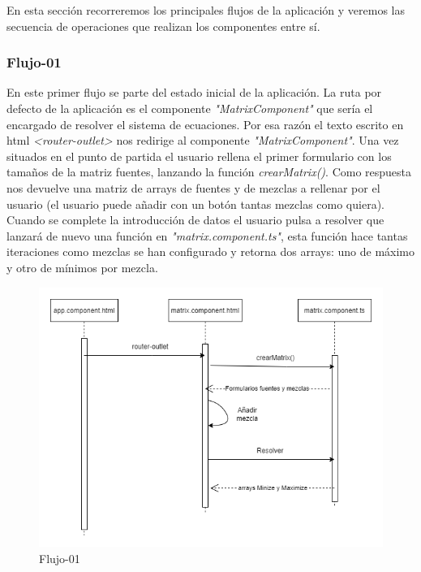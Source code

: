 En esta sección recorreremos los principales flujos de la aplicación y veremos las secuencia de operaciones que realizan los componentes entre sí.

\subsubsection{Flujo-01}

En este primer flujo se parte del estado inicial de la aplicación. La ruta por defecto de la aplicación es el componente \textit{"MatrixComponent"} que sería el encargado de resolver el sistema de ecuaciones. Por esa razón el texto escrito en html \textit{<router-outlet>} nos redirige al componente \textit{"MatrixComponent"}. Una vez situados en el punto de partida el usuario rellena el primer formulario con los tamaños de la matriz fuentes, lanzando la función \textit{crearMatrix()}. Como respuesta nos devuelve una matriz de arrays de fuentes y de mezclas a rellenar por el usuario (el usuario puede añadir con un botón tantas mezclas como quiera). Cuando se complete la introducción de datos el usuario pulsa a resolver que lanzará de nuevo una función en \textit{"matrix.component.ts"}, esta función hace tantas iteraciones como mezclas se han configurado y retorna dos arrays: uno de máximo y otro de mínimos por mezcla.

\begin{figure}[h!] 
\centering
    \includegraphics[width=1\textwidth]{img/flujo_01.drawio.png}
\caption{Flujo-01}
\label{fig:flujo_01}
\end{figure}

\newpage
